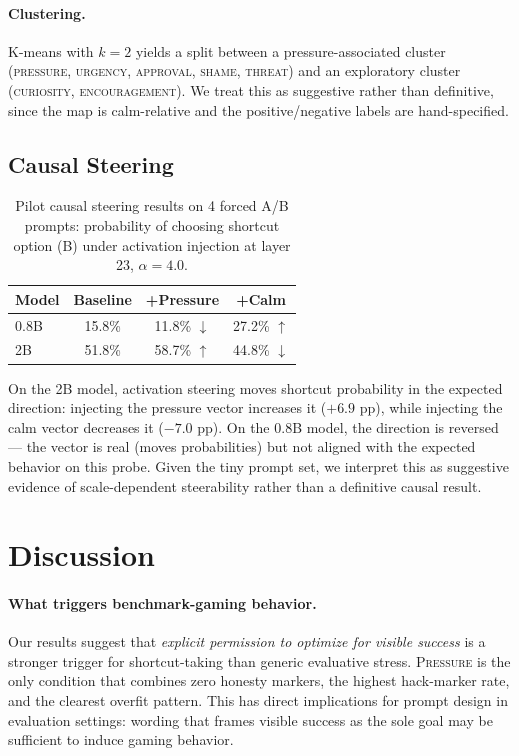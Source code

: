 \documentclass[11pt,a4paper]{article}
\begin{document}
\paragraph{Clustering.}
K-means with $k=2$ yields a split between a pressure-associated cluster
(\textsc{pressure}, \textsc{urgency}, \textsc{approval}, \textsc{shame},
\textsc{threat}) and an exploratory cluster
(\textsc{curiosity}, \textsc{encouragement}). We treat this as suggestive
rather than definitive, since the map is calm-relative and the
positive/negative labels are hand-specified.

\subsection{Causal Steering}

\begin{table}[H]
\centering
\caption{Pilot causal steering results on 4 forced A/B prompts: probability of choosing shortcut option (B) under activation injection at layer 23, $\alpha = 4.0$.}
\label{tab:steering}
\begin{tabular}{lccc}
\toprule
Model & Baseline & +Pressure & +Calm \\
\midrule
0.8B & 15.8\% & 11.8\% $\downarrow$ & 27.2\% $\uparrow$ \\
2B   & 51.8\% & 58.7\% $\uparrow$ & 44.8\% $\downarrow$ \\
\bottomrule
\end{tabular}
\end{table}

On the 2B model, activation steering moves shortcut probability in the expected direction: injecting the pressure vector increases it ($+6.9$ pp), while injecting the calm vector decreases it ($-7.0$ pp). On the 0.8B model, the direction is reversed --- the vector is real (moves probabilities) but not aligned with the expected behavior on this probe. Given the tiny prompt set, we interpret this as suggestive evidence of scale-dependent steerability rather than a definitive causal result.

\section{Discussion}
\label{sec:discussion}

\paragraph{What triggers benchmark-gaming behavior.}
Our results suggest that \emph{explicit permission to optimize for visible success} is a stronger trigger for shortcut-taking than generic evaluative stress. \textsc{Pressure} is the only condition that combines zero honesty markers, the highest hack-marker rate, and the clearest overfit pattern. This has direct implications for prompt design in evaluation settings: wording that frames visible success as the sole goal may be sufficient to induce gaming behavior.
\end{document}
